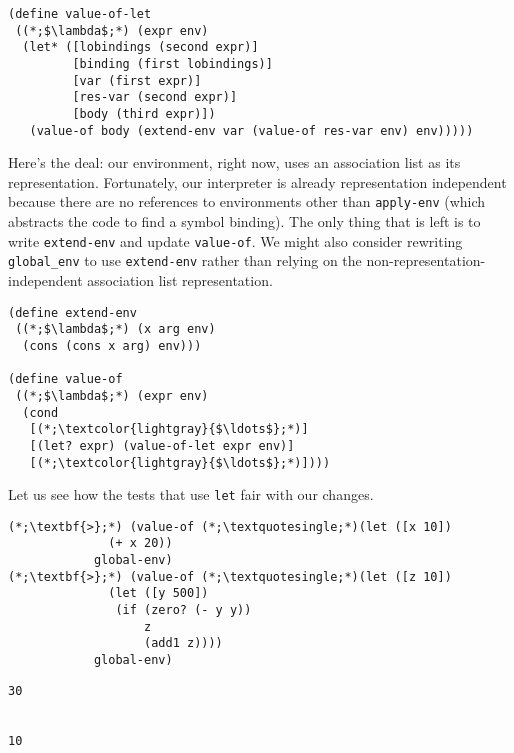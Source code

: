 \begin{cl}[]{}\begin{lstlisting}[language=MyScheme]
(define value-of-let
 ((*;$\lambda$;*) (expr env)
  (let* ([lobindings (second expr)]
         [binding (first lobindings)]
         [var (first expr)]
         [res-var (second expr)]
         [body (third expr)])
   (value-of body (extend-env var (value-of res-var env) env)))))
\end{lstlisting}\end{cl}

Here's the deal: our environment, right now, uses an association list as its representation. Fortunately, our interpreter is already representation independent because there are no references to environments other than \texttt{apply-env} (which abstracts the code to find a symbol binding). The only thing that is left is to write \texttt{extend-env} and update \texttt{value-of}. We might also consider rewriting \texttt{global\_env} to use \texttt{extend-env} rather than relying on the non-representation-independent association list representation.

\begin{cl}[]{}\begin{lstlisting}[language=MyScheme]
(define extend-env
 ((*;$\lambda$;*) (x arg env)
  (cons (cons x arg) env)))

(define value-of
 ((*;$\lambda$;*) (expr env)
  (cond
   [(*;\textcolor{lightgray}{$\ldots$};*)]
   [(let? expr) (value-of-let expr env)]
   [(*;\textcolor{lightgray}{$\ldots$};*)])))
\end{lstlisting}\end{cl}

Let us see how the tests that use \texttt{let} fair with our changes.

\begin{cloast}[]{}
\begin{lstlisting}[language=MyNLNSOutput]
(*;\textbf{>};*) (value-of (*;\textquotesingle;*)(let ([x 10]) 
              (+ x 20))
            global-env)
(*;\textbf{>};*) (value-of (*;\textquotesingle;*)(let ([z 10]) 
              (let ([y 500]) 
               (if (zero? (- y y)) 
                   z 
                   (add1 z))))
            global-env)
\end{lstlisting}
\tcblower
\begin{lstlisting}[language=MyOutput]
30


10
\end{lstlisting}
\end{cloast}

